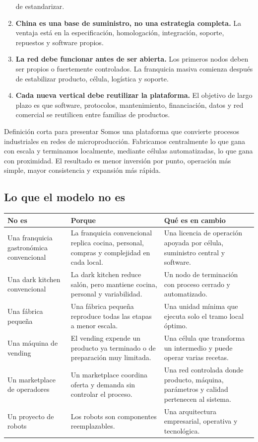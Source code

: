 \documentclass[11pt,a4paper]{article}
\begin{document}
\begin{enumerate}[leftmargin=1.8em]
de estandarizar.
\item \textbf{China es una base de suministro, no una estrategia completa.} La ventaja está en la
especificación, homologación, integración, soporte, repuestos y software propios.
\item \textbf{La red debe funcionar antes de ser abierta.} Los primeros nodos deben ser propios o
fuertemente controlados. La franquicia masiva comienza después de estabilizar producto, célula, logística
y soporte.
\item \textbf{Cada nueva vertical debe reutilizar la plataforma.} El objetivo de largo plazo es que
software, protocolos, mantenimiento, financiación, datos y red comercial se reutilicen entre familias de
productos.
\end{enumerate}

\begin{caja}{Definición corta para presentar}
Somos una plataforma que convierte procesos industriales en redes de microproducción. Fabricamos
centralmente lo que gana con escala y terminamos localmente, mediante células automatizadas, lo que gana
con proximidad. El resultado es menor inversión por punto, operación más simple, mayor consistencia y
expansión más rápida.
\end{caja}

\subsection{Lo que el modelo no es}
{\small
\begin{xltabular}{\textwidth}{@{}P{3.4cm}LL@{}}
\toprule
\textbf{No es} & \textbf{Porque} & \textbf{Qué es en cambio}\\ \midrule
Una franquicia gastronómica convencional & La franquicia convencional replica cocina, personal, compras y complejidad en cada local. & Una licencia de operación apoyada por célula, suministro central y software.\\
Una dark kitchen convencional & La dark kitchen reduce salón, pero mantiene cocina, personal y variabilidad. & Un nodo de terminación con proceso cerrado y automatizado.\\
Una fábrica pequeña & Una fábrica pequeña reproduce todas las etapas a menor escala. & Una unidad mínima que ejecuta solo el tramo local óptimo.\\
Una máquina de vending & El vending expende un producto ya terminado o de preparación muy limitada. & Una célula que transforma un intermedio y puede operar varias recetas.\\
Un marketplace de operadores & Un marketplace coordina oferta y demanda sin controlar el proceso. & Una red controlada donde producto, máquina, parámetros y calidad pertenecen al sistema.\\
Un proyecto de robots & Los robots son componentes reemplazables. & Una arquitectura empresarial, operativa y tecnológica.\\
\bottomrule
\end{xltabular}}
\end{document}

